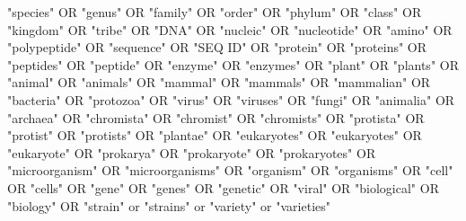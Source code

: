 \documentclass[]{book}
\newenvironment{Shaded}{\begin{snugshade}}{\end{snugshade}}
\newcommand{\NormalTok}[1]{#1}
\newcommand{\StringTok}[1]{\textcolor[rgb]{0.31,0.60,0.02}{#1}}
\theoremstyle{definition}
\theoremstyle{definition}
\theoremstyle{definition}
\theoremstyle{remark}
\begin{document}
\begin{Shaded}
\begin{Highlighting}[]
\StringTok{"species"}\NormalTok{ OR }\StringTok{"genus"}\NormalTok{ OR }\StringTok{"family"}\NormalTok{ OR }\StringTok{"order"}\NormalTok{ OR }\StringTok{"phylum"}\NormalTok{ OR }\StringTok{"class"}\NormalTok{ OR }\StringTok{"kingdom"}\NormalTok{ OR }\StringTok{"tribe"}\NormalTok{ OR }\StringTok{"DNA"}\NormalTok{ OR }\StringTok{"nucleic"}\NormalTok{ OR }\StringTok{"nucleotide"}\NormalTok{ OR }\StringTok{"amino"}\NormalTok{ OR }\StringTok{"polypeptide"}\NormalTok{ OR }\StringTok{"sequence"}\NormalTok{ OR }\StringTok{"SEQ ID"}\NormalTok{ OR }\StringTok{"protein"}\NormalTok{ OR }\StringTok{"proteins"}\NormalTok{ OR }\StringTok{"peptides"}\NormalTok{ OR }\StringTok{"peptide"}\NormalTok{ OR }\StringTok{"enzyme"}\NormalTok{ OR }\StringTok{"enzymes"}\NormalTok{ OR }\StringTok{"plant"}\NormalTok{ OR }\StringTok{"plants"}\NormalTok{ OR }\StringTok{"animal"}\NormalTok{ OR }\StringTok{"animals"}\NormalTok{ OR }\StringTok{"mammal"}\NormalTok{ OR }\StringTok{"mammals"}\NormalTok{ OR }\StringTok{"mammalian"}\NormalTok{ OR }\StringTok{"bacteria"}\NormalTok{ OR }\StringTok{"protozoa"}\NormalTok{ OR }\StringTok{"virus"}\NormalTok{ OR }\StringTok{"viruses"}\NormalTok{ OR }\StringTok{"fungi"}\NormalTok{ OR }\StringTok{"animalia"}\NormalTok{ OR }\StringTok{"archaea"}\NormalTok{ OR }\StringTok{"chromista"}\NormalTok{ OR }\StringTok{"chromist"}\NormalTok{ OR }\StringTok{"chromists"}\NormalTok{ OR }\StringTok{"protista"}\NormalTok{ OR }\StringTok{"protist"}\NormalTok{ OR }\StringTok{"protists"}\NormalTok{ OR }\StringTok{"plantae"}\NormalTok{ OR }\StringTok{"eukaryotes"}\NormalTok{ OR }\StringTok{"eukaryotes"}\NormalTok{ OR }\StringTok{"eukaryote"}\NormalTok{ OR }\StringTok{"prokarya"}\NormalTok{ OR }\StringTok{"prokaryote"}\NormalTok{ OR }\StringTok{"prokaryotes"}\NormalTok{ OR }\StringTok{"microorganism"}\NormalTok{ OR }\StringTok{"microorganisms"}\NormalTok{ OR }\StringTok{"organism"}\NormalTok{ OR }\StringTok{"organisms"}\NormalTok{ OR }\StringTok{"cell"}\NormalTok{ OR }\StringTok{"cells"}\NormalTok{ OR }\StringTok{"gene"}\NormalTok{ OR }\StringTok{"genes"}\NormalTok{ OR }\StringTok{"genetic"}\NormalTok{ OR }\StringTok{"viral"}\NormalTok{ OR }\StringTok{"biological"}\NormalTok{ OR }\StringTok{"biology"}\NormalTok{ OR }\StringTok{"strain"}\NormalTok{ or }\StringTok{"strains"}\NormalTok{ or }\StringTok{"variety"}\NormalTok{ or }\StringTok{"varieties"}
\end{Highlighting}
\end{Shaded}
\end{document}
